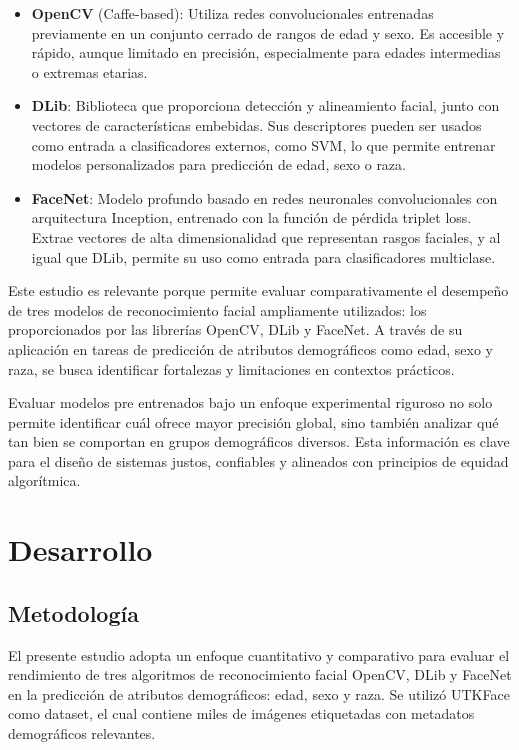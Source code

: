 \begin{itemize}
  \item \textbf{OpenCV} (Caffe-based): Utiliza redes convolucionales entrenadas previamente en un conjunto cerrado de rangos de edad y sexo. Es accesible y rápido, aunque limitado en precisión, especialmente para edades intermedias o extremas etarias.
  \item \textbf{DLib}: Biblioteca que proporciona detección y alineamiento facial, junto con vectores de características embebidas. Sus descriptores pueden ser usados como entrada a clasificadores externos, como SVM, lo que permite entrenar modelos personalizados para predicción de edad, sexo o raza.
  \item \textbf{FaceNet}: Modelo profundo basado en redes neuronales convolucionales con arquitectura Inception, entrenado con la función de pérdida triplet loss. Extrae vectores de alta dimensionalidad que representan rasgos faciales, y al igual que DLib, permite su uso como entrada para clasificadores multiclase.
\end{itemize}

Este estudio es relevante porque permite evaluar comparativamente el desempeño de tres modelos de reconocimiento facial ampliamente utilizados: los proporcionados por las librerías OpenCV, DLib y FaceNet. A través de su aplicación en tareas de predicción de atributos demográficos como edad, sexo y raza, se busca identificar fortalezas y limitaciones en contextos prácticos.

Evaluar modelos pre entrenados bajo un enfoque experimental riguroso no solo permite identificar cuál ofrece mayor precisión global, sino también analizar qué tan bien se comportan en grupos demográficos diversos. Esta información es clave para el diseño de sistemas justos, confiables y alineados con principios de equidad algorítmica.

\section{Desarrollo}
\subsection{Metodología}
El presente estudio adopta un enfoque cuantitativo y comparativo para evaluar el rendimiento de tres algoritmos de reconocimiento facial OpenCV, DLib y FaceNet en la predicción de atributos demográficos: edad, sexo y raza. Se utilizó UTKFace como dataset, el cual contiene miles de imágenes etiquetadas con metadatos demográficos relevantes.

